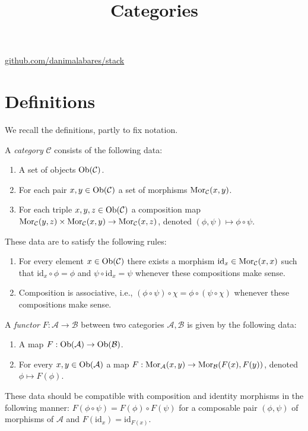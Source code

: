 



\title{Categories}
\maketitle

\label{section-phantom}
\hfill
\href{http://github.com/danimalabares/stack}{github.com/danimalabares/stack}

\tableofcontents

\section{Definitions}
\label{section-definition-categories}

\noindent
We recall the definitions, partly to fix notation.

\begin{definition}
\label{definition-category}
A {\it category} $\mathcal{C}$ consists of the following data:
\begin{enumerate}
\item A set of objects $\mathop{\mathrm{Ob}}\nolimits(\mathcal{C})$.
\item For each pair $x, y \in \mathop{\mathrm{Ob}}\nolimits(\mathcal{C})$ a set of morphisms
$\mathop{\mathrm{Mor}}\nolimits_\mathcal{C}(x, y)$.
\item For each triple $x, y, z\in \mathop{\mathrm{Ob}}\nolimits(\mathcal{C})$ a composition
map $ \mathop{\mathrm{Mor}}\nolimits_\mathcal{C}(y, z) \times \mathop{\mathrm{Mor}}\nolimits_\mathcal{C}(x, y)
\to \mathop{\mathrm{Mor}}\nolimits_\mathcal{C}(x, z) $, denoted $(\phi, \psi) \mapsto
\phi \circ \psi$.
\end{enumerate}
These data are to satisfy the following rules:
\begin{enumerate}
\item For every element $x\in \mathop{\mathrm{Ob}}\nolimits(\mathcal{C})$ there exists a
morphism $\text{id}_x\in \mathop{\mathrm{Mor}}\nolimits_\mathcal{C}(x, x)$ such that
$\text{id}_x \circ \phi = \phi$ and $\psi \circ \text{id}_x = \psi $ whenever
these compositions make sense.
\item Composition is associative, i.e., $(\phi \circ \psi) \circ \chi =
\phi \circ ( \psi \circ \chi)$ whenever these compositions make sense.
\end{enumerate}
\end{definition}

\begin{definition}
\label{definition-functor}
A {\it functor} $F : \mathcal{A} \to \mathcal{B}$
between two categories $\mathcal{A}, \mathcal{B}$ is given by the
following data:
\begin{enumerate}
\item A map $F : \mathop{\mathrm{Ob}}\nolimits(\mathcal{A}) \to \mathop{\mathrm{Ob}}\nolimits(\mathcal{B})$.
\item For every $x, y \in \mathop{\mathrm{Ob}}\nolimits(\mathcal{A})$ a map
$F : \mathop{\mathrm{Mor}}\nolimits_\mathcal{A}(x, y) \to \mathop{\mathrm{Mor}}\nolimits_\mathcal{B}(F(x), F(y))$,
denoted $\phi \mapsto F(\phi)$.
\end{enumerate}
These data should be compatible with composition and identity morphisms
in the following manner: $F(\phi \circ \psi) =
F(\phi) \circ F(\psi)$ for a composable pair $(\phi, \psi)$ of
morphisms of $\mathcal{A}$ and $F(\text{id}_x) = \text{id}_{F(x)}$.
\end{definition}


